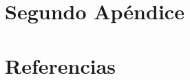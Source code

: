 \documentclass[msc,oneside,a4paper]{udelar} %
\begin{document}
  \hypertarget{segundo-apuxe9ndice}{%
  \chapter{Segundo Apéndice}\label{segundo-apuxe9ndice}}
  
  \backmatter
  
  \hypertarget{referencias}{%
  \chapter*{Referencias}\label{referencias}}
  
  
  \noindent
  
  \setlength{\parindent}{-0.20in}
  \setlength{\leftskip}{0.20in}
  \setlength{\parskip}{8pt}
  
  
\end{document}
